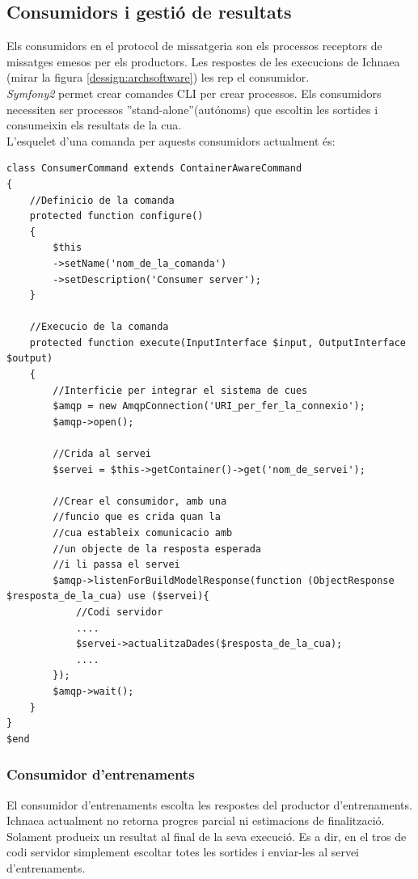 \subsection{Consumidors i gesti\'{o} de resultats}
Els consumidors en el protocol de missatgeria son els processos receptors de missatges emesos per els productors. Les respostes de les execucions de Ichnaea  (mirar la figura \ref{dessign:archsoftware}) les rep el consumidor. \\

\textit{Symfony2} permet crear comandes CLI per crear processos. Els consumidors necessiten ser processos ''stand-alone''(aut\'{o}noms) que escoltin les sortides i consumeixin els resultats de la cua. \\

L'esquelet d'una comanda per aquests consumidors actualment \'{e}s:
\begin{lstlisting}
class ConsumerCommand extends ContainerAwareCommand
{
	//Definicio de la comanda
	protected function configure()
	{
		$this
		->setName('nom_de_la_comanda')
		->setDescription('Consumer server');
	}
	
	//Execucio de la comanda
	protected function execute(InputInterface $input, OutputInterface $output)
	{
		//Interficie per integrar el sistema de cues
		$amqp = new AmqpConnection('URI_per_fer_la_connexio');
		$amqp->open();
		
		//Crida al servei
		$servei = $this->getContainer()->get('nom_de_servei');
		
		//Crear el consumidor, amb una 
		//funcio que es crida quan la 
		//cua estableix comunicacio amb 
		//un objecte de la resposta esperada 
		//i li passa el servei 
		$amqp->listenForBuildModelResponse(function (ObjectResponse $resposta_de_la_cua) use ($servei){
		 	//Codi servidor
		 	....
			$servei->actualitzaDades($resposta_de_la_cua);
			....
		});
		$amqp->wait();
	}
}
$end
\end{lstlisting}

\subsubsection{Consumidor d'entrenaments}
El consumidor d'entrenaments escolta les respostes del productor d'entrenaments. \\

Ichnaea actualment no retorna progres parcial ni estimacions de finalitzaci\'{o}. Solament produeix un resultat al final de la seva execució. Es a dir, en el tros de codi servidor simplement escoltar totes les sortides i enviar-les al servei d'entrenaments.


